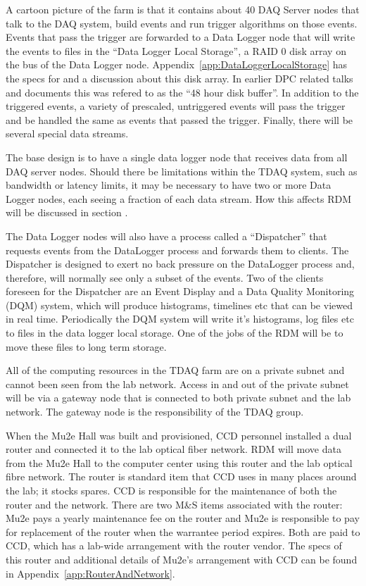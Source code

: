 A cartoon picture of the farm is that it contains about 40 DAQ Server nodes
that talk to the DAQ system, build events and run trigger algorithms on those events.
Events that pass the trigger are forwarded to a Data Logger node that will write the events
to files in the ``Data Logger Local Storage'', a RAID 0 disk array on the bus of the Data Logger node.
Appendix~\ref{app:DataLoggerLocalStorage} has the specs for and a discussion about this disk array.
In earlier DPC related talks and documents this was refered to as the ``48 hour disk buffer''.
In addition to the triggered events, a variety of prescaled, untriggered events will pass the
trigger and be handled the same as events that passed the trigger.
Finally, there will be several special data streams.

The base design is to have a single data logger node that receives data from all DAQ server nodes.
Should there be limitations within the TDAQ system, such as bandwidth or latency limits,
it may be necessary to have two or more Data Logger nodes, each seeing a fraction of each data stream.
How this affects RDM will be discussed in section .

The Data Logger nodes will also have a process called a ``Dispatcher''
that requests events from the DataLogger process
and forwards them to clients.
The Dispatcher is designed to exert no back pressure on the DataLogger process
and, therefore, will normally see only a subset of the events.
Two of the clients foreseen for the Dispatcher are an Event Display and
a Data Quality Monitoring (DQM) system,
which will produce histograms, timelines etc that can be viewed in real time.
Periodically the DQM system will write it's histograms, log files etc to
files in the data logger local storage.  One of the jobs of the RDM will be
to move these files to long term storage.

All of the computing resources in the TDAQ farm are on a private subnet
and cannot been seen from the lab network.  Access in and out
of the private subnet will be via a gateway node that is connected to
both private subnet and the lab network.  The gateway node is the responsibility
of the TDAQ group.

When the Mu2e Hall was built and provisioned, CCD personnel installed a dual router
and connected it to the lab optical fiber network.
RDM will move data from the Mu2e Hall
to the computer center using this router and the lab optical fibre network.
The router is standard item that CCD uses in many places around the lab; it stocks spares.
CCD is responsible for the maintenance of both the router and the network.
There are two M\&S items associated with the router: Mu2e pays a yearly
maintenance fee on the router and Mu2e is responsible to pay for replacement
of the router when the warrantee period expires.  Both are paid to CCD,
which has a lab-wide arrangement with the router vendor.
The specs of this router and additional details of Mu2e's arrangement with CCD
can be found in Appendix~\ref{app:RouterAndNetwork}.

